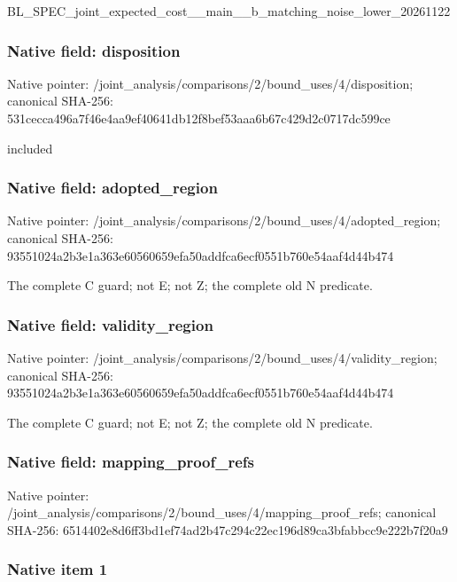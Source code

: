\documentclass[10pt,a4paper]{article}
\begin{document}
BL\_SPEC\_joint\_expected\_c\allowbreak{}ost\_\_main\_\_b\_matching\_no\allowbreak{}ise\_lower\_20261122


\subsubsection{Native field: disposition}


Native pointer: /joint\_analysis/comparis\allowbreak{}ons/2/bound\_uses/4/dispo\allowbreak{}sition; canonical SHA-256: 531cecca496a7f46e4aa9ef4\allowbreak{}0641db12f8bef53aaa6b67c4\allowbreak{}29d2c0717dc599ce


included


\subsubsection{Native field: adopted\_region}


Native pointer: /joint\_analysis/comparis\allowbreak{}ons/2/bound\_uses/4/adopt\allowbreak{}ed\_region; canonical SHA-256: 93551024a2b3e1a363e60560\allowbreak{}659efa50addfca6ecf0551b7\allowbreak{}60e54aaf4d44b474


The complete C guard; not E; not Z; the complete old N predicate.


\subsubsection{Native field: validity\_region}


Native pointer: /joint\_analysis/comparis\allowbreak{}ons/2/bound\_uses/4/valid\allowbreak{}ity\_region; canonical SHA-256: 93551024a2b3e1a363e60560\allowbreak{}659efa50addfca6ecf0551b7\allowbreak{}60e54aaf4d44b474


The complete C guard; not E; not Z; the complete old N predicate.


\subsubsection{Native field: mapping\_proof\_refs}


Native pointer: /joint\_analysis/comparis\allowbreak{}ons/2/bound\_uses/4/mappi\allowbreak{}ng\_proof\_refs; canonical SHA-256: 6514402e8d6ff3bd1ef74ad2\allowbreak{}b47c294c22ec196d89ca3bfa\allowbreak{}bbcc9e222b7f20a9



\subsubsection{Native item 1}
\end{document}
